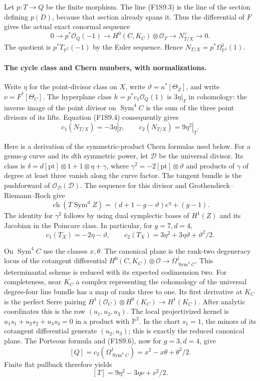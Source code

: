 Let $p:T\to Q$ be the finite morphism. The line (F1S9.3) is the line of
the section defining $p(D)$, because that section already spans it.
Thus the differential of $F$ gives the actual exact conormal sequence
\[
 0\longrightarrow p^*\mathcal O_Q(-1)
  \longrightarrow H^0(C,K_C)\otimes\mathcal O_T
  \longrightarrow N^\vee_{T/X}\longrightarrow0.
 \tag{F1S9.4}
\]
The quotient is $p^*T_{\mathbb P^2}(-1)$ by the Euler sequence. Hence
$N_{T/X}=p^*\Omega_{\mathbb P^2}^1(1)$.

\paragraph{The cycle class and Chern numbers, with normalizations.}
Write $\eta$ for the point-divisor class on $X$, write
$\vartheta=a^*[\Theta_Z]$, and write
$\nu=F^*[\Theta_C]$. The hyperplane class $h=p^*c_1\mathcal O_Q(1)$
is $3\eta|_T$ in cohomology: the inverse image of the point divisor
on $\operatorname{Sym}^4C$ is the sum of the three point divisors of
its lifts. Equation (F1S9.4) consequently gives
\[
 c_1(N_{T/X})=-3\eta|_T,\qquad c_2(N_{T/X})=9\eta^2|_T.
 \tag{F1S9.5}
\]

Here is a derivation of the symmetric-product Chern formulas used below.
For a genus-$g$ curve and its $d$th symmetric power, let $\mathcal D$
be the universal divisor. Its class is
$\delta=d[\mathrm{pt}]\otimes1+1\otimes\eta+\gamma$, where
$\gamma^2=-2[\mathrm{pt}]\otimes\vartheta$ and products of $\gamma$
of degree at least three vanish along the curve factor. The tangent
bundle is the pushforward of $\mathcal O_{\mathcal D}(\mathcal D)$.
The sequence for this divisor and Grothendieck--Riemann--Roch give
\[
 \operatorname{ch}(T\operatorname{Sym}^d Z)
       =(d+1-g-\vartheta)e^\eta+(g-1).
 \tag{F1S9.6}
\]
The identity for $\gamma^2$ follows by using dual symplectic bases of
$H^1(Z)$ and its Jacobian in the Poincare class. In particular, for
$g=7,d=4$,
\[
 c_1(T_X)=-2\eta-\vartheta,\qquad
 c_2(T_X)=3\eta^2+3\eta\vartheta+\vartheta^2/2.
 \tag{F1S9.7}
\]

On $\operatorname{Sym}^4C$ use the classes $x,\theta$. The canonical
plane is the rank-two degeneracy locus of the cotangent differential
$H^0(C,K_C)\otimes\mathcal O\to\Omega^1_{\operatorname{Sym}^4C}$.
This determinantal scheme is reduced with its expected codimension two.
For completeness, near $K_C$ a complex representing the cohomology of
the universal degree-four line bundle has a map of ranks three to one.
Its first derivative at $K_C$ is the perfect Serre pairing
$H^1(\mathcal O_C)\otimes H^0(K_C)\to H^1(K_C)$.
After analytic coordinates this is the row $(u_1,u_2,u_3)$.
The local projectivized kernel is
$u_1s_1+u_2s_2+u_3s_3=0$ in a product with $\mathbb P^2$.
In the chart $s_1=1$, the minors of its cotangent differential
generate $(u_2,u_3)$; this is exactly the reduced canonical plane.
The Porteous formula and (F1S9.6), now for $g=3,d=4$, give
\[
 [Q]=c_2(\Omega^1_{\operatorname{Sym}^4C})
       =x^2-x\theta+\theta^2/2.
\]
Finite flat pullback therefore yields
\[
                         [T]=9\eta^2-3\eta\nu+\nu^2/2.
 \tag{F1S9.8}
\]

